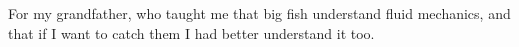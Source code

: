 For my grandfather, who taught me that big fish understand fluid mechanics, and that if I want to catch them I had better understand it too.

